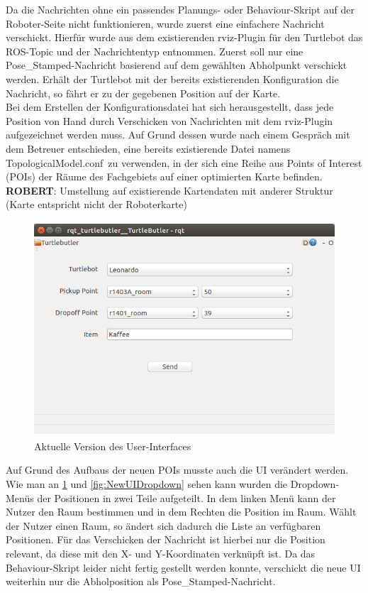 \documentclass[a4paper,12pt,headsepline]{scrartcl}
\begin{document}
		Da die Nachrichten ohne ein passendes Planungs- oder Behaviour-Skript auf der Roboter-Seite nicht funktionieren, wurde zuerst eine einfachere Nachricht verschickt. Hierfür wurde aus dem existierenden rviz-Plugin für den Turtlebot das ROS-Topic und der Nachrichtentyp entnommen. Zuerst soll nur eine \glqq Pose{\_}Stamped\grqq-Nachricht basierend auf dem gewählten Abholpunkt verschickt werden. Erhält der Turtlebot mit der bereits existierenden Konfiguration die Nachricht, so fährt er zu der gegebenen Position auf der Karte.\\
		Bei dem Erstellen der Konfigurationsdatei hat sich herausgestellt, dass jede Position von Hand durch Verschicken von Nachrichten mit dem rviz-Plugin aufgezeichnet werden muss. Auf Grund dessen wurde nach einem Gespräch mit dem Betreuer entschieden, eine bereits existierende Datei namens \glqq TopologicalModel.conf\grqq\ zu verwenden, in der sich eine Reihe aus Points of Interest (POIs) der Räume des Fachgebiets auf einer optimierten Karte befinden.\\
		\textbf{ROBERT}: Umstellung auf existierende Kartendaten mit anderer Struktur (Karte entspricht nicht der Roboterkarte)
		\begin{figure} [H]
			\centering
			\includegraphics[height=8cm]{Images/Turtlebutler_Used.png}
			\caption{Aktuelle Version des User-Interfaces}
			\label{fig:NewUI}
		\end{figure}
		Auf Grund des Aufbaus der neuen POIs musste auch die UI verändert werden. Wie man an \cref{fig:NewUI} und \cref{fig:NewUIDropdown} sehen kann wurden die Dropdown-Menüs der Positionen in zwei Teile aufgeteilt. In dem linken Menü kann der Nutzer den Raum bestimmen und in dem Rechten die Position im Raum. Wählt der Nutzer einen Raum, so ändert sich dadurch die Liste an verfügbaren Positionen. Für das Verschicken der Nachricht ist hierbei nur die Position relevant, da diese mit den X- und Y-Koordinaten verknüpft ist. Da das Behaviour-Skript leider nicht fertig gestellt werden konnte, verschickt die neue UI weiterhin nur die Abholposition als \glqq Pose{\_}Stamped\grqq-Nachricht.
\end{document}
